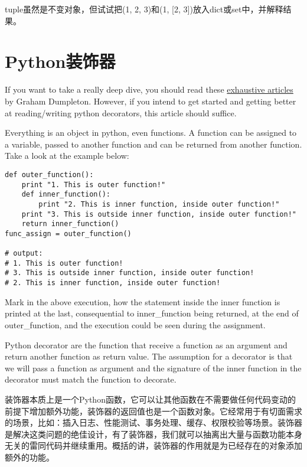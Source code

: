 tuple虽然是不变对象，但试试把(1, 2, 3)和(1, [2, 3])放入dict或set中，并解释结果。


\section{Python装饰器}
If you want to take a really deep dive, you should read these \href{https://github.com/GrahamDumpleton/wrapt/tree/develop/blog}{exhaustive articles} by Graham Dumpleton. However, if you intend to get started and getting better at reading/writing python decorators, this article should suffice.

Everything is an object in python, even functions. A function can be assigned to a variable, passed to another function and can be returned from another function. Take a look at the example below:

\begin{verbatim}
def outer_function():
    print "1. This is outer function!"
    def inner_function():
        print "2. This is inner function, inside outer function!"
    print "3. This is outside inner function, inside outer function!"
    return inner_function()
func_assign = outer_function()

# output:
# 1. This is outer function!
# 3. This is outside inner function, inside outer function!
# 2. This is inner function, inside outer function!
\end{verbatim}

Mark in the above execution, how the statement inside the inner function is printed at the last, consequential to inner\_function being returned, at the end of outer\_function, and the execution could be seen during the assignment.

Python decorator are the function that receive a function as an argument and return another function as return value. The assumption for a decorator is that we will pass a function as argument and the signature of the inner function in the decorator must match the function to decorate.

装饰器本质上是一个Python函数，它可以让其他函数在不需要做任何代码变动的前提下增加额外功能，装饰器的返回值也是一个函数对象。它经常用于有切面需求的场景，比如：插入日志、性能测试、事务处理、缓存、权限校验等场景。装饰器是解决这类问题的绝佳设计，有了装饰器，我们就可以抽离出大量与函数功能本身无关的雷同代码并继续重用。概括的讲，装饰器的作用就是为已经存在的对象添加额外的功能。


